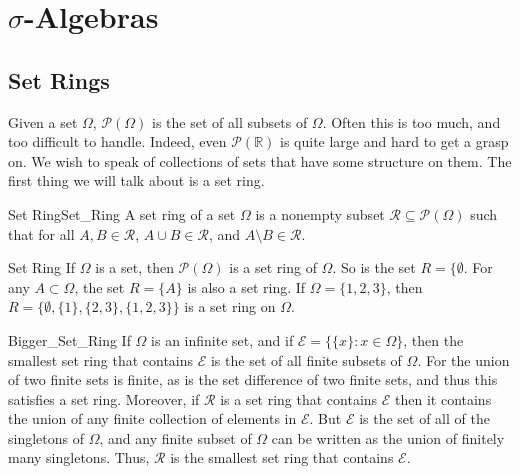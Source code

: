 \section{\texorpdfstring{$\sigma$}{Sigma}-Algebras}
    \subsection{Set Rings}
        Given a set $\Omega$, $\mathcal{P}(\Omega)$ is the
        set of all subsets of $\Omega$. Often this is too
        much, and too difficult to handle. Indeed, even
        $\mathcal{P}(\mathbb{R})$ is quite large and hard
        to get a grasp on. We wish to speak of collections
        of sets that have some structure on them.
        The first thing we will talk about is a set ring.
        \begin{ldefinition}{Set Ring}{Set_Ring}
            A set ring of a set $\Omega$ is a nonempty subset
            $\mathcal{R}\subseteq\mathcal{P}(\Omega)$ such
            that for all
            $A,B\in\mathcal{R}$, $A\cup{B}\in\mathcal{R}$,
            and $A\setminus{B}\in\mathcal{R}$.
        \end{ldefinition}
        \begin{lexample}{}{Set Ring}
            If $\Omega$ is a set, then
            $\mathcal{P}(\Omega)$ is a set ring of
            $\Omega$. So is the set $R=\{\emptyset$.
            For any $A\subset\Omega$, the set
            $R=\{A\}$ is also a set ring. If
            $\Omega=\{1,2,3\}$, then
            $R=\{\emptyset,\{1\},\{2,3\},\{1,2,3\}\}$ is
            a set ring on $\Omega$.
        \end{lexample}
        \begin{lexample}{}{Bigger_Set_Ring}
            If $\Omega$ is an infinite set, and if
            $\mathcal{E}=\big\{\{x\}:x\in\Omega\big\}$, then the
            smallest set ring that contains $\mathcal{E}$ is the set of
            all finite subsets of $\Omega$. For the union of two finite
            sets is finite, as is the set difference of two finite sets,
            and thus this satisfies a set ring. Moreover, if $\mathcal{R}$
            is a set ring that contains $\mathcal{E}$ then it contains the
            union of any finite collection of elements in $\mathcal{E}$.
            But $\mathcal{E}$ is the set of all of the singletons of
            $\Omega$, and any finite subset of $\Omega$ can be written
            as the union of finitely many singletons. Thus, $\mathcal{R}$
            is the smallest set ring that contains $\mathcal{E}$.
        \end{lexample}
